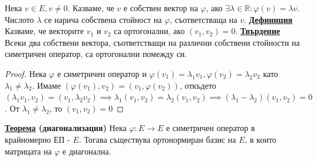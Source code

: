 \documentclass{article}
\begin{document}
Нека $v \in E, v \neq 0$. Казваме, че $v$ е собствен вектор на $\varphi$, ако $\exists \lambda \in \mathbb{R} : \varphi(v) = \lambda v$. Числото
$\lambda$ се нарича собствена стойност на $\varphi$, съответстваща на $v$. \newline\newline
\textbf{\underline{Дефиниция}}
Казваме, че векторите $v_1$ и $v_2$ са ортогонални, ако $(v_1, v_2) = 0$. \newline\newline
\textbf{\underline{Твърдение}} \newline
Всеки два собствени вектора, съответстващи на различни собствени стойности на симетричен оператор, са ортогонални помежду си.
\begin{proof}
Нека $\varphi$ е симетричен оператор и $\varphi(v_1) = \lambda_1v_1, \varphi(v_2) = \lambda_2v_2$ като $\lambda_1 \neq \lambda_2$. Имаме $(\varphi(v_1), v_2) = (v_1, \varphi(v_2))$, откъдето $(\lambda_1 v_1, v_2)
= (v_1, \lambda_2 v_2) \implies \lambda_1(v_1, v_2) = \lambda_2(v_1, v_2) \implies (\lambda_1 - \lambda_2)(v_1, v_2) = 0$. От
$\lambda_1 \neq \lambda_2$, то $(v_1, v_2) = 0$ \newline
\end{proof}
\textbf{\underline{Теорема} (диагонализация)} \newline
Нека $\varphi: E \rightarrow E$ е симетричен оператор в крайномерно ЕП - $E$. Тогава съществува ортонормиран базис на $E$, в които матрицата
на $\varphi$ е диагонална.
\end{document}

